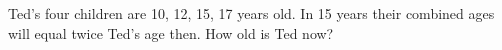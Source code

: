 Ted's four children are 10, 12, 15, 17 years old. In 15 years their combined ages will equal twice Ted's age then. How old is Ted now?
